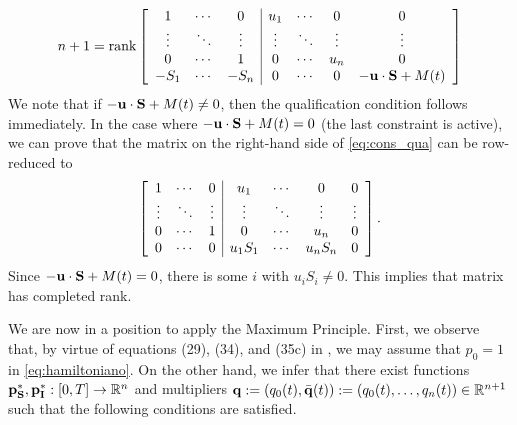 \documentclass[a4paper,10pt]{article}
\theoremstyle{remark}
\begin{document}
\begin{equation}\label{eq:cons_qua}
n+1=
 \operatorname{rank}
                    \left[
                    \begin{array}{c c c|c c c c }
                      1      & \cdots & 0      & u_1    & \cdots& 0 &  0       \\
                      \vdots & \ddots & \vdots & \vdots & \ddots&\vdots & \vdots   \\
                      0      & \cdots & 1      & 0 &\cdots &  u_n   &   0      \\                                  
                      -S_1   &\cdots  & -S_n      & 0      &\cdots &0 & -\bold{u}\cdot \bold{S}+M(t)\\
                     \end{array}
                    \right]
\end{equation}
We note that if $-\bold{u}\cdot \bold{S}+M(t)\neq 0$, then the qualification condition follows immediately. In the case where $-\bold{u}\cdot \bold{S}+M(t)=0$ (the last constraint is active), we can prove that the matrix on the right-hand side of \eqref{eq:cons_qua} can be row-reduced to
\begin{equation*}\label{eq:cons_qua1}
                    \left[
                    \begin{array}{c c c|c c c c }
                      1      & \cdots & 0      & u_1    & \cdots& 0 &  0       \\
                      \vdots & \ddots & \vdots & \vdots & \ddots&\vdots & \vdots   \\
                      0      & \cdots & 1      & 0 &\cdots &  u_n   &   0      \\                                  
                      0   &\cdots  & 0      & u_1S_1      &\cdots & u_nS_n & 0\\
                     \end{array}
                    \right].
\end{equation*}
Since $-\bold{u}\cdot \bold{S}+M(t)= 0$, there is some $i$ with $u_iS_i\neq 0$. This implies that matrix has completed rank. 

We are now in a position to apply the Maximum Principle. First, we observe that, by virtue of equations (29), (34), and (35c) in \cite[Th. 4.1]{A.Seierstad499}, we may assume that $p_0=1$ in \eqref{eq:hamiltoniano}. On the other hand, we infer that there exist functions $\bold{p}^\ast_{\bold{S}},\bold{p}^\ast_{\bold{I}}:[0,T]\to\mathbb{R}^n$ and multipliers $\bold{q}:=(q_0(t),\bar{\bold{q}}(t)):=(q_0(t),\ldots,q_n(t))\in\mathbb{R}^{n+1}$ such that the following conditions are satisfied.
\end{document}
